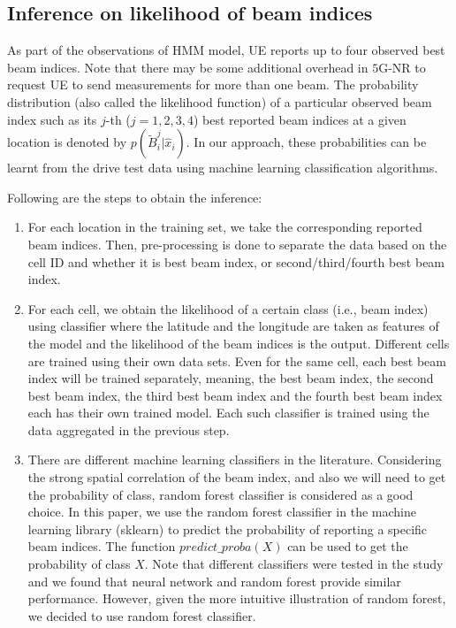 \documentclass[conference, 10pt]{IEEEtran}
\begin{document}
\subsection{Inference on likelihood of beam indices}
\label{sec:prob-classification}
As part of the observations of HMM model, UE reports up to four observed best beam indices. Note that there may be some additional overhead in $5$G-NR to request UE to send measurements for more than one beam. The probability
distribution (also called the likelihood function) of a particular observed beam index such as its $j$-th ($j=1, 2, 3, 4$) best reported beam indices
at a given location is denoted by
$p(\tilde{B}^j_i|\hat{x}_{i})$. In our approach, these probabilities
can be learnt from the drive test data using machine learning classification algorithms.

Following are the steps to obtain the inference:

\begin{enumerate}

\item For each location in the training set, we
take the corresponding reported beam indices. Then, pre-processing is done to separate the data based on the cell ID and whether it is best beam index, or second/third/fourth best beam index.

\item For each cell, we obtain the likelihood of a certain class (i.e., beam index) using classifier where the latitude and the longitude are 
taken as features of the model and the likelihood of the beam indices is the output. Different cells are trained using their own data sets. Even for the same
cell, each best beam index will be trained separately, meaning, the best beam index, the second best beam index, the third best beam index and the fourth best beam index each has their own trained model.
Each such classifier is trained using the data aggregated in the previous step.

\item There are different machine learning classifiers in the literature. Considering the strong spatial correlation of the beam index, and also we will need to get the probability of class, random forest classifier is considered as a good choice. 
In this paper, we use the random forest classifier in the machine learning library (sklearn) to predict the probability of 
reporting a specific beam indices. The function $predict\_proba(X)$ can be used to get the probability of class $X$. Note that different classifiers were tested in the study and we found that
neural network and random forest provide similar performance. However, given the more intuitive illustration of random forest, we decided to use random forest classifier.
\end{enumerate}
\end{document}
